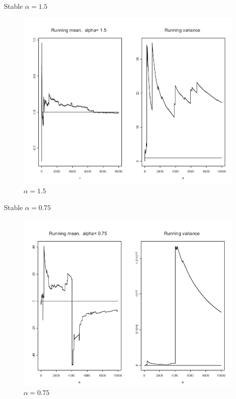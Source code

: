 \documentclass[ignorenonframetext,]{beamer}
\begin{document}
\begin{frame}{Stable \(\alpha = 1.5\)}

\begin{figure}
\centering
\includegraphics{pics/06.png}
\caption{\(\alpha = 1.5\)}
\end{figure}

\end{frame}

\begin{frame}{Stable \(\alpha = 0.75\)}

\begin{figure}
\centering
\includegraphics{pics/07.png}
\caption{\(\alpha = 0.75\)}
\end{figure}

\end{frame}
\end{document}
